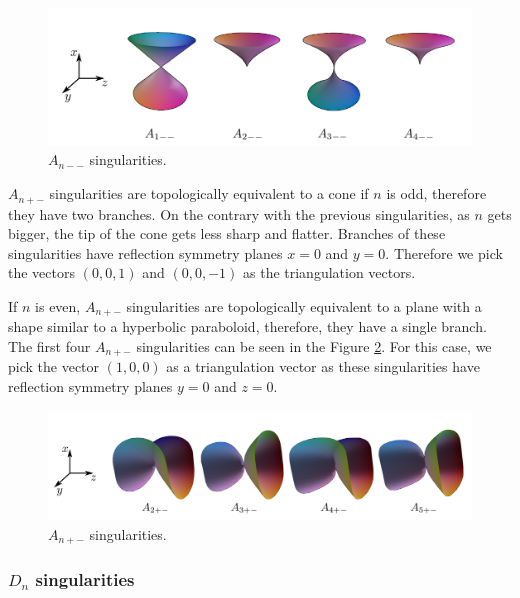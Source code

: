 \begin{figure}
    \centerline{\includegraphics[scale=0.5]{images/img4}}
    \caption[$A_{n--}$ singularities]
    {$A_{n--}$ singularities. \cite{morris2003client}}
    \label{img:4}
\end{figure}


$A_{n+-}$ singularities are topologically equivalent to a cone if $n$ is odd, therefore
they have two branches.
On the contrary with the previous singularities, as $n$ gets bigger, the tip
of the cone gets less sharp and flatter. Branches of these singularities have 
reflection symmetry planes $x=0$ and $y=0$. Therefore we pick the vectors
$(0, 0, 1)$ and $(0, 0, -1)$ as the triangulation vectors.

If $n$ is even, $A_{n+-}$ singularities are topologically equivalent to a plane
with a shape similar to a hyperbolic paraboloid, therefore, they have a single branch.
The first four $A_{n+-}$ singularities can be seen in the Figure \ref{img:5}.
For this case, we pick the vector $(1, 0, 0)$ as a triangulation vector as
these singularities have reflection symmetry planes $y=0$ and $z=0$.

\begin{figure}
    \centerline{\includegraphics[scale=0.5]{images/img5}}
    \caption[$A_{n+-}$ singularities]
    {$A_{n+-}$ singularities. \cite{morris2003client}}
    \label{img:5}
\end{figure}

\subsubsection*{$D_n$ singularities}

